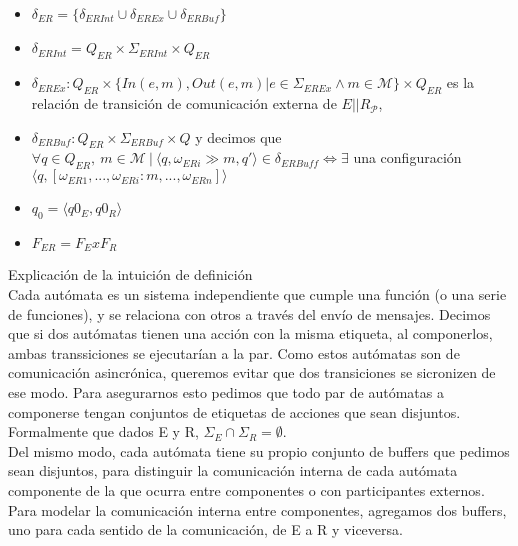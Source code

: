 \begin{definition}[Composición]
\begin{itemize}
\item $\delta_{ER} = \{ \delta_{ER \mathit{Int}} \cup \delta_{ER\mathit{Ex}} \cup \delta_{ER\mathit{Buf}}\}$
\item $\delta_{ER\mathit{Int}} = Q_{ER} \times \Sigma_{ER\mathit{Int}} \times Q_{ER} $
\item $\delta_{ER\mathit{Ex}}: Q_{ER} \times \{\mathit{In}(e,m), \mathit{Out}(e,m) | e \in \Sigma_{ER\mathit{Ex}} \land m \in \mathcal{M}\} \times Q_{ER}$ es la relación de transición de comunicación externa de $E||R_\mathcal{P}$,
\item $\delta_{ER\mathit{Buf}}: Q_{ER} \times \Sigma_{ER\mathit{Buf}} \times Q$ y decimos que $\forall q \in Q_\mathit{ER}, \ m \in \mathcal{M} \ |	 \ \langle q, \omega_\mathit{ERi} \gg m, q' \rangle \in \delta_\mathit{ERBuff} \iff \exists$ una configuración $ \langle q, [\omega_\mathit{ER1},...,\omega_\mathit{ERi}:m, ..., \omega_\mathit{ERn}] \rangle$ 

\item $q_0 = \langle q0_E,q0_R \rangle$
\item $F_{ER} = F_E x F_R$

\end{itemize}
\end{definition}


Explicación de la intuición de definición \\

Cada autómata es un sistema independiente que cumple una función (o una serie de funciones), y se relaciona con otros a través del envío de mensajes. Decimos que si dos autómatas tienen una acción con la misma etiqueta, al componerlos, ambas transsiciones se ejecutarían a la par. Como estos autómatas son de comunicación asincrónica, queremos evitar que dos transiciones se sicronizen de ese modo. Para asegurarnos esto pedimos que todo par de autómatas a componerse tengan conjuntos de etiquetas de acciones que sean disjuntos. Formalmente que dados E y R, $\Sigma_E \cap \Sigma_R = \emptyset$. \\

Del mismo modo, cada autómata tiene su propio conjunto de buffers que pedimos sean disjuntos, para distinguir la comunicación interna de cada autómata componente de la que ocurra entre componentes o con participantes externos. Para modelar la comunicación interna entre componentes, agregamos dos buffers, uno para cada sentido de la comunicación, de E a R y viceversa.\\

